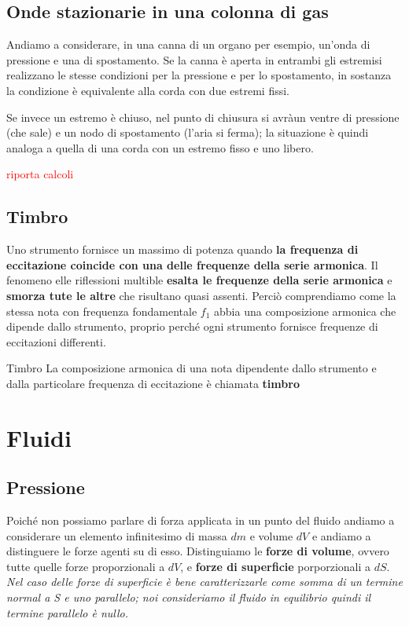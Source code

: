\documentclass[x11names]{article}
\begin{document}
		\subsection{Onde stazionarie in una colonna di gas}
		Andiamo a considerare, in una canna di un organo per esempio, un'onda di pressione e una di spostamento. Se la canna è aperta in entrambi gli estremisi realizzano le stesse condizioni per la pressione e per lo spostamento, in sostanza la condizione è equivalente alla corda con due estremi fissi.
		
		Se invece un estremo è chiuso, nel punto di chiusura si avràun ventre di pressione (che sale) e un nodo di spostamento (l'aria si ferma); la situazione è quindi analoga a quella di una corda con un estremo fisso e uno libero.
		
		\begin{center}
			\textcolor{red}{riporta calcoli}
		\end{center}
		
		\subsection{Timbro}
		Uno strumento fornisce un massimo di potenza quando \textbf{la frequenza di eccitazione coincide con una delle frequenze della serie armonica}. Il fenomeno elle riflessioni multible \textbf{esalta le frequenze della serie armonica} e \textbf{smorza tute le altre} che risultano quasi assenti. Perciò comprendiamo come la stessa nota con frequenza fondamentale \(f_1\) abbia una composizione armonica che dipende dallo strumento, proprio perché ogni strumento fornisce frequenze di eccitazioni differenti.
		
		\begin{center}
			\colorbox{myblue}{\begin{minipage}{5.75in}
					\begin{blues}{Timbro}
						La composizione armonica di una nota dipendente dallo strumento e dalla particolare frequenza di eccitazione è chiamata \textbf{timbro}
					\end{blues}
			\end{minipage}}
		\end{center}
		
	
			
	
\newpage
\section{Fluidi}
	\subsection{Pressione}
	Poiché non possiamo parlare di forza applicata in un punto del fluido andiamo a considerare un elemento infinitesimo di massa \(dm\) e volume \(dV\) e andiamo a distinguere le forze agenti su di esso. Distinguiamo le \textbf{forze di volume}, ovvero tutte quelle forze proporzionali a \(dV\), e \textbf{forze di superficie} porporzionali a \(dS\). \textit{Nel caso delle forze di superficie è bene caratterizzarle come somma di un termine normal a S e uno parallelo; noi consideriamo il fluido in equilibrio quindi il termine parallelo è nullo.}
	
\end{document}
